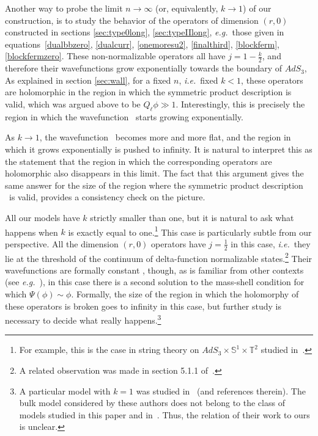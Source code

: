 \documentclass[12pt]{article}
\def\ie{{i.e.}}
\def\eg{{e.g.}}
\def\half{\frac12}
\newcommand{\bS}{{\mathbb S}}
\newcommand{\bT}{{\mathbb T}}
\numberwithin{equation}{section}
\def\ie{{\it i.e.}}
\def\eg{{\it e.g.}}
\def\half{\frac12}
\def\ie{{\it i.e.}}
\def\eg{{\it e.g.}}
\begin{document}
Another way to probe the limit $n\to\infty$ (or, equivalently, $k\to 1$) of our construction, is to study the behavior of the operators of dimension $(r,0)$ constructed in sections \ref{sec:type0long}, \ref{sec:typeIIlong}, \eg\ those given in equations~\eqref{dualbbzero}, \eqref{dualcurr}, \eqref{onemoresu2}, \eqref{finalthird}, \eqref{blockferm}, \eqref{blockfermzero}. These non-normalizable operators all have $j=1-\frac k2$, and therefore their wavefunctions grow exponentially towards the boundary of $AdS_3$, 
\eqn[growthhol]{\Psi(\phi)\sim e^{Q\left(j-\half\right)\phi}=e^{\frac{1-k}{2}Q\phi}=e^{\frac{Q_\ell\phi}{2}} ~.}
As explained in section \ref{sec:wall}, for a fixed $n$, \ie\ fixed $k<1$, these operators are holomorphic in the region in which the symmetric product description is valid, which was argued above to be $Q_\ell^{~}\phi\gg1$. Interestingly, this is precisely the region in which the wavefunction \growthhol\ starts growing exponentially. 

As $k\to 1$, the wavefunction \growthhol\ becomes more and more flat, and the region in which it grows exponentially is pushed to infinity. It is natural to interpret this as the statement that the region in which the corresponding operators are holomorphic also disappears in this limit. The fact that this argument gives the same answer for the size of the region where the symmetric product description \ourcft\ is valid, provides a consistency check on the picture.   

All our models have $k$ strictly smaller than one, but it is natural to ask what happens when $k$ is exactly equal to one.\footnote{For example, this is the case in string theory on $AdS_3\times \bS^1\times \bT^2$ studied in~.} This case is particularly subtle from our perspective. All the dimension $(r,0)$ operators have $j=\half$ in this case, \ie\ they lie at the threshold of the continuum of delta-function normalizable states.\footnote{A related observation was made in section 5.1.1 of~.} Their wavefunctions are formally constant \growthhol, though, as is familiar from other contexts (see \eg~), in this case there is a second solution to the mass-shell condition for which $\Psi(\phi)\sim\phi$.  Formally, the size of the region in which the holomorphy of these operators is broken goes to infinity in this case, but further study is necessary to decide what really happens.\footnote{A particular model with $k=1$ was studied in~ (and references therein). The bulk model considered by these authors does not belong to the class of models studied in this paper and in~. Thus, the relation of their work to ours is unclear.}    
\end{document}
